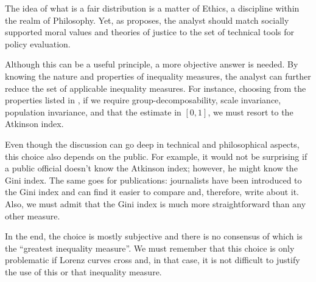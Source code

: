 \documentclass[
]{book}
\begin{document}
The idea of what is a fair distribution is a matter of Ethics, a discipline within the realm of Philosophy. Yet, as \textcite[Ch.1]{fleur1996} proposes, the analyst should match socially supported moral values and theories of justice to the set of technical tools for policy evaluation.

Although this can be a useful principle, a more objective answer is needed. By knowing the nature and properties of inequality measures, the analyst can further reduce the set of applicable inequality measures. For instance, choosing from the properties listed in \textcite[p.74]{cowell2011}, if we require group-decomposability, scale invariance, population invariance, and that the estimate in \([0,1]\), we must resort to the Atkinson index.

Even though the discussion can go deep in technical and philosophical aspects, this choice also depends on the public. For example, it would not be surprising if a public official doesn't know the Atkinson index; however, he might know the Gini index. The same goes for publications: journalists have been introduced to the Gini index and can find it easier to compare and, therefore, write about it. Also, we must admit that the Gini index is much more straightforward than any other measure.

In the end, the choice is mostly subjective and there is no consensus of which is the ``greatest inequality measure''. We must remember that this choice is only problematic if Lorenz curves cross and, in that case, it is not difficult to justify the use of this or that inequality measure.

\printbibliography
\end{document}
